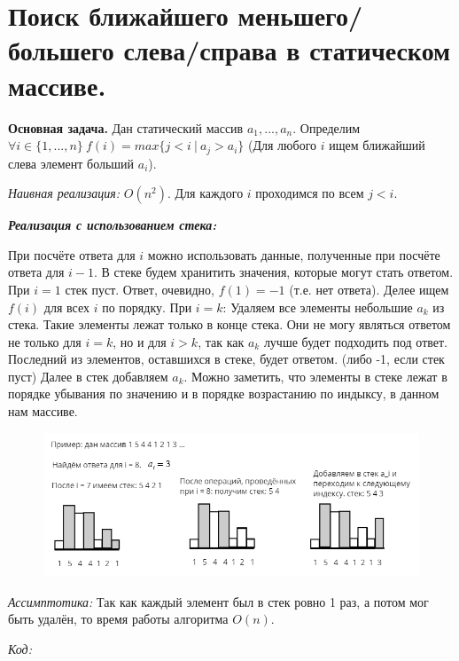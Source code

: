 \section{Поиск ближайшего меньшего/большего слева/справа в статическом массиве.}

\textbf{Основная задача.} Дан статический массив $a_1, ..., a_n$. Определим $\forall i \in \{1, ..., n\} \ f(i) = max\{j < i \ | \ a_j > a_i\}$ (Для любого $i$ ищем ближайший слева элемент больший $a_i$).

\textit{Наивная реализация:} $O(n^2)$. Для каждого $i$ проходимся по всем $j < i$.

\textit{\textbf{Реализация с использованием стека:}}

При посчёте ответа для $i$ можно использовать данные, полученные при посчёте ответа для $i - 1$. В стеке будем хранитить значения, которые могут стать ответом. При $i = 1$ стек пуст. Ответ, очевидно, $f(1) = -1$ (т.е. нет ответа). Делее ищем $f(i)$ для всех $i$ по порядку. При $i = k$: Удаляем все элементы небольшие $a_k$ из стека. Такие элементы лежат только в конце стека. Они не могу являться ответом не только для $i = k$, но и для $i > k$, так как $a_k$ лучше будет подходить под ответ. Последний из элементов, оставшихся в стеке, будет ответом. (либо -1, если стек пуст) Далее в стек добавляем $a_k$. Можно заметить, что элементы в стеке лежат в порядке убывания по значению и в порядке возрастанию по индыксу, в данном нам массиве. 

\begin{figure}[h]
\begin{center}
\includegraphics[width=0.9\linewidth]{images/2-5_stack_5_2}
\label{fig:mpr}
\end{center}
\end{figure}

\textit{Ассимптотика:} Так как каждый элемент был в стек ровно 1 раз, а потом мог быть удалён, то время работы алгоритма $O(n)$. 

\textit{Код:}



